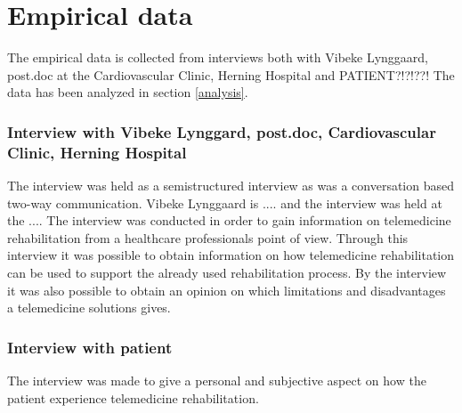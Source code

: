 \chapter{Empirical data}


The empirical data is collected from interviews both with Vibeke Lynggaard, post.doc at the Cardiovascular Clinic, Herning Hospital and PATIENT?!?!??! The data has been analyzed in section \ref{analysis}. 

\subsection{Interview with Vibeke Lynggard, post.doc, Cardiovascular Clinic, Herning Hospital}
The interview was held as a semistructured interview as was a conversation based two-way communication. Vibeke Lynggaard is .... and the interview was held at the .... The interview was conducted in order to gain information on telemedicine rehabilitation from a healthcare professionals point of view. Through this interview it was possible to obtain information on how telemedicine rehabilitation can be used to support the already used rehabilitation process. By the interview it was also possible to obtain an opinion on which limitations and disadvantages a telemedicine solutions gives.   
 
\subsection{Interview with patient}
The interview was made to give a personal and subjective aspect on how the patient experience telemedicine rehabilitation.  























